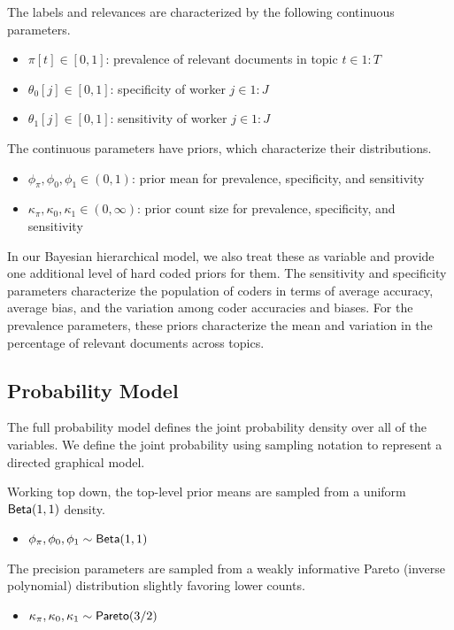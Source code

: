 \documentclass{article}
\begin{document}
The labels and relevances are characterized by the following continuous parameters.
%
\begin{itemize}
\item $\pi[t] \in [0,1]$: prevalence of relevant documents in topic $t \in
1{:}T$
\item $\theta_0[j] \in [0,1]$: specificity of worker $j \in 1{:}J$
\item $\theta_1[j] \in [0,1]$: sensitivity of worker $j \in 1{:}J$
\end{itemize}
%
The continuous parameters have priors, which characterize their distributions.
%
\begin{itemize}
\item $\phi_{\pi}, \phi_0, \phi_1  \in (0,1)$: prior mean for
prevalence, specificity, and sensitivity
\item $\kappa_{\pi}, \kappa_0, \kappa_1 \in (0,\infty)$: prior count
size for prevalence, specificity, and sensitivity
\end{itemize}
%
In our Bayesian hierarchical model, we also treat these as variable
and provide one additional level of hard coded priors for them.  The
sensitivity and specificity parameters characterize the population of
coders in terms of average accuracy, average bias, and the
variation among coder accuracies and biases.  For the prevalence parameters,
these priors characterize the mean and variation in the percentage of relevant documents
across topics.


\subsection{Probability Model}

The full probability model defines the joint probability density over
all of the variables.  We define the joint probability using sampling
notation to represent a directed graphical model.  

Working top down, the top-level prior means are sampled from
a uniform $\mbox{\sf Beta}(1,1)$ density.
%
\begin{itemize}
\item $\phi_{\pi}, \phi_0, \phi_1 \sim \mbox{\sf Beta}(1,1)$
\end{itemize}
%
The precision parameters are sampled from a weakly informative Pareto
(inverse polynomial) distribution slightly favoring lower counts.
%
\begin{itemize}
\item $\kappa_{\pi}, \kappa_0, \kappa_1 \sim \mbox{\sf Pareto}(3/2)$
\end{itemize}
%
\end{document}
